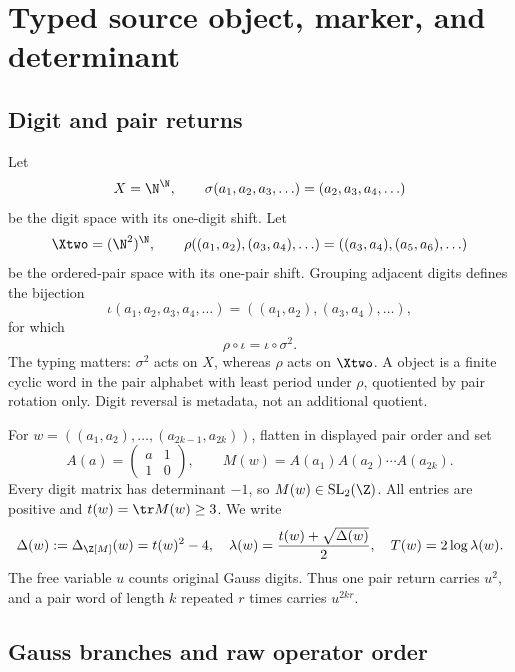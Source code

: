 \section{Typed source object, marker, and determinant}
\label{sec:source}

\subsection{Digit and pair returns}

Let
\[
  X=\N^{\N},\qquad
  \sigma(a_1,a_2,a_3,\ldots)=(a_2,a_3,a_4,\ldots)
\]
be the digit space with its one-digit shift.  Let
\[
  \Xtwo=(\N^2)^{\N},\qquad
  \rho((a_1,a_2),(a_3,a_4),\ldots)
  =((a_3,a_4),(a_5,a_6),\ldots)
\]
be the ordered-pair space with its one-pair shift.  Grouping adjacent digits
defines the bijection
\[
  \iota(a_1,a_2,a_3,a_4,\ldots)
  =((a_1,a_2),(a_3,a_4),\ldots),
\]
for which
\begin{equation}
  \rho\circ\iota=\iota\circ\sigma^2.
  \label{eq:grouping-conjugacy}
\end{equation}
The typing matters: $\sigma^2$ acts on $X$, whereas $\rho$ acts on $\Xtwo$.
A \RhoPrimitive{} object is a finite cyclic word in the pair alphabet with
least period under $\rho$, quotiented by pair rotation only.  Digit reversal
is metadata, not an additional quotient.

For
$w=((a_1,a_2),\ldots,(a_{2k-1},a_{2k}))$, flatten in displayed pair order
and set
\begin{equation}
  A(a)=\begin{pmatrix}a&1\\1&0\end{pmatrix},
  \qquad
  M(w)=A(a_1)A(a_2)\cdots A(a_{2k}).
  \label{eq:monodromy}
\end{equation}
Every digit matrix has determinant $-1$, so $M(w)\in\mathrm{SL}_2(\Z)$.
All entries are positive and $t(w)=\tr M(w)\ge3$.  We write
\begin{equation}
  \Delta(w):=\Delta_{\Z[M]}(w)=t(w)^2-4,
  \quad
  \lambda(w)=\frac{t(w)+\sqrt{\Delta(w)}}2,
  \quad
  T(w)=2\log\lambda(w).
  \label{eq:labels-clock}
\end{equation}
The free variable $u$ counts original Gauss digits.  Thus one pair return
carries $u^2$, and a pair word of length $k$ repeated $r$ times carries
$u^{2kr}$.

\subsection{Gauss branches and raw operator order}

